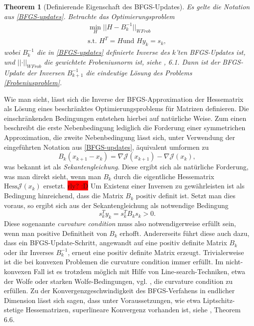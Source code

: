 \documentclass[bibliography=totoc,12pt,a4paper]{scrartcl}
\theoremstyle{exampstyle}
\newtheorem{theorem}[defi]{Theorem}
\numberwithin{equation}{section}
\begin{document}
\begin{theorem}[Definierende Eigenschaft des BFGS-Updates]
		
	Es gelte die Notation aus \ref{BFGS-updates}. Betrachte das Optimierungsproblem
	\begin{equation}\label{Frobeniusproblem}
	\begin{aligned}
		\underset{H}{\min} \vert\vert H - B_k^{-1} \vert\vert _{WFrob} \\
		\text{s.t. } H^T = H \text{und } H y_k = s_k,
	\end{aligned}
	\end{equation}
	wobei $B_k^{-1}$ die in \ref{BFGS-updates} definierte Inverse des $k$'ten BFGS-Updates ist, und $\vert\vert \cdot \vert\vert_{WFrob}$ die gewichtete Frobeniusnorm ist, siehe \cite{Nocedal}, 6.1. Dann ist der BFGS-Update der Inversen $B_{k+1}^{-1}$ die eindeutige Lösung des Problems \ref{Frobeniusproblem}.
\end{theorem}
Wie man sieht, lässt sich die Inverse der BFGS-Approximation der Hessematrix als Lösung eines beschränktes Optimierungsproblems für Matrizen definieren. Die einschränkenden Bedingungen entstehen hierbei auf natürliche Weise. Zum einen beschreibt die erste Nebenbedingung lediglich die Forderung einer symmetrichen Approximation, die zweite Nebenbedingung lässt sich, unter Verwendung der eingeführten Notation aus \ref{BFGS-updates}, äquivalent umformen zu
\begin{equation}
	B_k (x_{k+1} - x_k) = \nabla \mathcal{J}(x_{k+1}) - \nabla \mathcal{J}(x_k),
\end{equation}
was bekannt ist als \textit{Sekantengleichung}. Diese ergibt sich als natürliche Forderung, was man direkt sieht, wenn man $B_k$ durch die eigentliche Hessematrix $\text{Hess}\mathcal{J}(x_k)$ ersetzt. \colorbox{red}{rly? :D} Um Existenz einer Inversen zu gewährleisten ist als Bedingung hinreichend, dass die Matrix $B_k$ positiv definit ist. Setzt man dies voraus, so ergibt sich aus der Sekantengleichung als notwendige Bedingung
\begin{equation}
	s_k^T y_k = s_k^T B_k s_k > 0.
\end{equation}
Diese sogenannte \textit{curvature condition} muss also notwendigerweise erfüllt sein, wenn man positive Definitheit von $B_k$ erhofft. Andererseits führt diese auch dazu, dass ein BFGS-Update-Schritt, angewandt auf eine positiv definite Matrix $B_k$ oder ihr Inverses $B_k^{-1}$, erneut eine positiv definite Matrix erzeugt. Trivialerweise ist die bei konvexen Problemen die curvature condition immer erfüllt. Im nicht-konvexen Fall ist es trotzdem möglich mit Hilfe von Line-search-Techniken, etwa der Wolfe oder starken Wolfe-Bedingungen, vgl. \cite{Nocedal}, die curvature condition zu erfüllen. Zu der Konvergenzgeschwindigkeit des BFGS-Verfahens in endlicher Dimension lässt sich sagen, dass unter Voraussetzungen, wie etwa Liptschitz-stetige Hessematrizen, superlineare Konvergenz vorhanden ist, siehe \cite{Nocedal}, Theorem 6.6.
\end{document}
